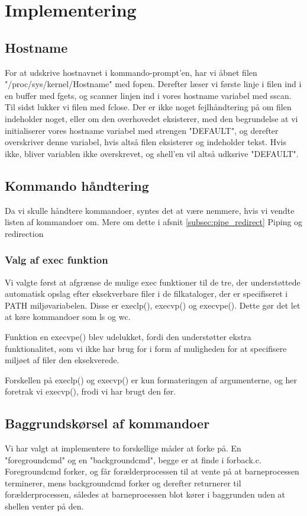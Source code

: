 \section{Implementering}

\subsection{Hostname}
For at udskrive hostnavnet i kommando-prompt'en, har vi åbnet filen "/proc/sys/kernel/Hostname" med fopen. Derefter læser vi første linje i filen ind i en buffer med fgets, og scanner linjen ind i vores hostname variabel med sscan. Til sidst lukker vi filen med fclose. Der er ikke noget fejlhåndtering på om filen indeholder noget, eller om den overhovedet eksisterer, med den begrundelse at vi initialiserer vores hostname variabel med strengen "DEFAULT", og derefter overskriver denne variabel, hvis altså filen eksisterer og indeholder tekst. Hvis ikke, bliver variablen ikke overskrevet, og shell'en vil altså udksrive "DEFAULT".

\subsection{Kommando håndtering}
Da vi skulle håndtere kommandoer, syntes det at være nemmere, hvis vi vendte listen af kommandoer om. Mere om dette i afsnit \ref{subsec:pipe_redirect} Piping og redirection

\subsubsection{Valg af exec funktion}
Vi valgte først at afgrænse de mulige exec funktioner til de tre, der understøttede automatisk opslag efter eksekverbare filer i de filkataloger, der er specifiseret i PATH miljøvariabelen. Disse er execlp(), execvp() og execvpe(). Dette gør det let at køre kommandoer som ls og wc.

Funktion en execvpe() blev udelukket, fordi den understøtter ekstra funktionalitet, som vi ikke har brug for i form af muligheden for at specifisere miljøet af filer den eksekverede.

Forskellen på execlp() og execvp() er kun formateringen af argumenterne, og her foretrak vi execvp(), frodi vi har brugt den før.

\subsection{Baggrundskørsel af kommandoer}
Vi har valgt at implementere to forskellige måder at forke på. En "foregroundcmd" og en "backgroundcmd", begge er at finde i forback.c. Foregroundcmd forker, og får forælderprocessen til at vente på at barneprocessen terminerer, mens backgroundcmd forker og derefter returnerer til forælderprocessen, således at barneprocessen blot kører i baggrunden uden at shellen venter på den.

